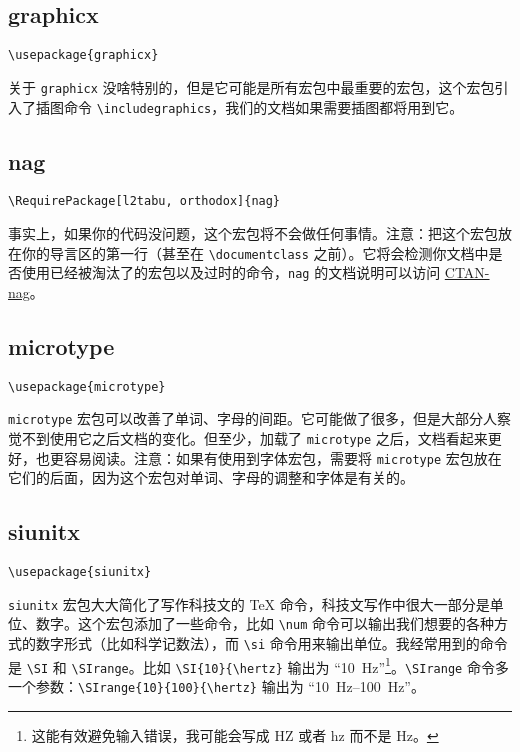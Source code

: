 \documentclass[cn]{elegantpaper}
\begin{document}
\subsection{graphicx}

\begin{lstlisting}
\usepackage{graphicx}
\end{lstlisting}

关于 \lstinline{graphicx} 没啥特别的，但是它可能是所有宏包中最重要的宏包，这个宏包引入了插图命令 \lstinline|\includegraphics|，我们的文档如果需要插图都将用到它。

\subsection{nag}

\begin{lstlisting}
\RequirePackage[l2tabu, orthodox]{nag}
\end{lstlisting}

事实上，如果你的代码没问题，这个宏包将不会做任何事情。注意：把这个宏包放在你的导言区的第一行（甚至在 \lstinline|\documentclass| 之前）。它将会检测你文档中是否使用已经被淘汰了的宏包以及过时的命令，\lstinline{nag} 的文档说明可以访问 \href{https://ctan.org/pkg/nag}{CTAN-nag}。

\subsection{microtype}

\begin{lstlisting}
\usepackage{microtype}
\end{lstlisting}

\lstinline{microtype} 宏包可以改善了单词、字母的间距。它可能做了很多，但是大部分人察觉不到使用它之后文档的变化。但至少，加载了 \lstinline{microtype} 之后，文档看起来更好，也更容易阅读。注意：如果有使用到字体宏包，需要将 \lstinline{microtype} 宏包放在它们的后面，因为这个宏包对单词、字母的调整和字体是有关的。

\subsection{siunitx}

\begin{lstlisting}
\usepackage{siunitx}
\end{lstlisting}

\lstinline{siunitx} 宏包大大简化了写作科技文的 \TeX{} 命令，科技文写作中很大一部分是单位、数字。这个宏包添加了一些命令，比如 \lstinline|\num| 命令可以输出我们想要的各种方式的数字形式（比如科学记数法），而 \lstinline|\si| 命令用来输出单位。我经常用到的命令是 \lstinline|\SI| 和 \lstinline|\SIrange|。比如 \lstinline|\SI{10}{\hertz}| 输出为 “\SI{10}{\hertz}”\footnote{这能有效避免输入错误，我可能会写成 HZ 或者 hz 而不是 Hz。}。\lstinline|\SIrange| 命令多一个参数：\lstinline|\SIrange{10}{100}{\hertz}| 输出为 “\SIrange{10}{100}{\hertz}”。
\end{document}

